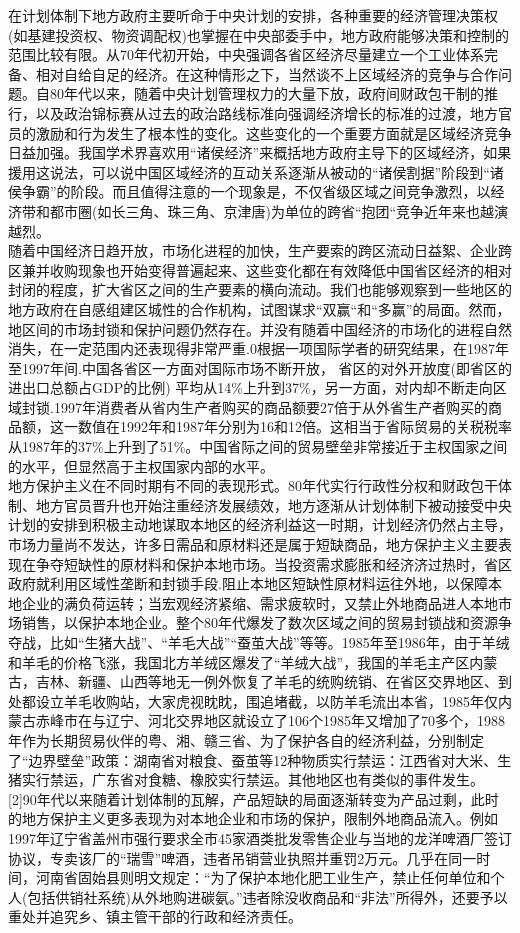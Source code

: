 \documentclass[11pt]{article}
\begin{document}
在计划体制下地方政府主要听命于中央计划的安排，各种重要的经济管理决策权(如基建投资权、物资调配权)也掌握在中央部委手中，地方政府能够决策和控制的范围比较有限。从70年代初开始，中央强调各省区经济尽量建立一个工业体系完备、相对自给自足的经济。在这种情形之下，当然谈不上区域经济的竞争与合作问题。自80年代以来，随着中央计划管理权力的大量下放，政府间财政包干制的推行，以及政治锦标赛从过去的政治路线标准向强调经济增长的标准的过渡，地方官员的激励和行为发生了根本性的变化。这些变化的一个重要方面就是区域经济竞争日益加强。我国学术界喜欢用“诸侯经济”来概括地方政府主导下的区域经济，如果援用这说法，可以说中国区域经济的互动关系逐渐从被动的“诸侯割据”阶段到“诸侯争霸”的阶段。而且值得注意的一个现象是，不仅省级区域之间竞争激烈，以经济带和都市圈(如长三角、珠三角、京津唐)为单位的跨省“抱团“竞争近年来也越演越烈。\\
随着中国经济日趋开放，市场化进程的加快，生产要索的跨区流动日益絮、企业跨区兼并收购现象也开始变得普遍起来、这些变化都在有效降低中国省区经济的相对封闭的程度，扩大省区之间的生产要素的横向流动。我们也能够观察到一些地区的地方政府在自感组建区城性的合作机构，试图谋求“双赢“和“多赢”的局面。然而，地区间的市场封锁和保护问题仍然存在。并没有随着中国经济的市场化的进程自然消失，在一定范围内还表现得非常严重.0根据一项国际学者的研究结果，在1987年至1997年间.中国各省区一方面对国际市场不断开放， 省区的对外开放度(即省区的进出口总额占GDP的比例) 平均从14\%上升到37\%，另一方面，对内却不断走向区域封锁.1997年消费者从省内生产者购买的商品额要27倍于从外省生产者购买的商品额，这一数值在1992年和1987年分别为16和12倍。这相当于省际贸易的关税税率从1987年的37\%上升到了51\%。中国省际之间的贸易壁垒非常接近于主权国家之间的水平，但显然高于主权国家内部的水平。\\
地方保护主义在不同时期有不同的表现形式。80年代实行行政性分权和财政包干体制、地方官员晋升也开始注重经济发展绩效，地方逐渐从计划体制下被动接受中央计划的安排到积极主动地谋取本地区的经济利益这一时期，计划经济仍然占主导，市场力量尚不发达，许多日需品和原材料还是属于短缺商品，地方保护主义主要表现在争夺短缺性的原材料和保护本地市场。当投资需求膨胀和经济济过热时，省区政府就利用区域性垄断和封锁手段.阻止本地区短缺性原材料运往外地，以保障本地企业的满负荷运转；当宏观经济紧缩、需求疲软时，又禁止外地商品进人本地市场销售，以保护本地企业。整个80年代爆发了数次区域之间的贸易封锁战和资源争夺战，比如“生猪大战”、“羊毛大战”“蚕茧大战”等等。1985年至1986年，由于羊绒和羊毛的价格飞涨，我国北方羊绒区爆发了“羊绒大战”，我国的羊毛主产区内蒙古，吉林、新疆、山西等地无一例外恢复了羊毛的统购统销、在省区交界地区、到处都设立羊毛收购站，大家虎视眈眈，围追堵截，以防羊毛流出本省，1985年仅内蒙古赤峰市在与辽宁、河北交界地区就设立了106个1985年又增加了70多个，1988年作为长期贸易伙伴的粤、湘、赣三省、为了保护各自的经济利益，分别制定了“边界壁垒”政策：湖南省对粮食、蚕茧等12种物质实行禁运：江西省对大米、生猪实行禁运，广东省对食糖、橡胶实行禁运。其他地区也有类似的事件发生。[2]90年代以来随着计划体制的瓦解，产品短缺的局面逐渐转变为产品过剩，此时的地方保护主义更多表现为对本地企业和市场的保护，限制外地商品流入。例如1997年辽宁省盖州市强行要求全市45家酒类批发零售企业与当地的龙洋啤酒厂签订协议，专卖该厂的“瑞雪”啤酒，违者吊销营业执照并重罚2万元。几乎在同一时间，河南省固始县则明文规定：“为了保护本地化肥工业生产，禁止任何单位和个人(包括供销社系统)从外地购进碳氨。”违者除没收商品和“非法”所得外，还要予以重处并追究乡、镇主管干部的行政和经济责任。\\
\end{document}

